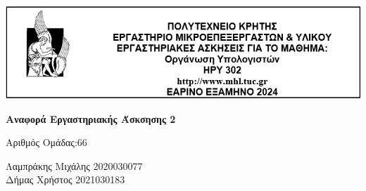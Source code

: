 \begin{center}
    \vspace*{-2cm} %
    \centering
    \hspace*{-0.1cm} %
    \includegraphics[width=1\textwidth]{Images/Lab_Title.png} %
\end{center}

\vspace{1cm}

\centering
{ \large \bfseries Αναφορά Εργαστηριακής Άσκσησης 2} %

\vspace{0.5cm}

Αριθμός Ομάδας:66\\

\raggedright
Λαμπράκης Μιχάλης   \hspace{2em}        2020030077\\
Δήμας Χρήστος       \hspace{3.8em}      2021030183\\

\vspace{1cm}